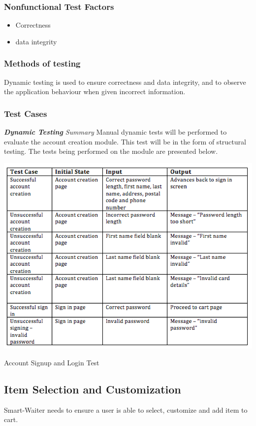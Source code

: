 \documentclass[12pt]{article}
\begin{document}
\subsubsection{Nonfunctional Test Factors}
\begin{itemize}
  \item Correctness
  \item data integrity
\end{itemize}


\subsubsection{Methods of testing}
Dynamic testing is used to ensure correctness and data integrity, and to observe the application behaviour when given incorrect information.
\subsubsection{Test Cases}
\textbf{\textit{Dynamic Testing}}\newline
\newline
\textit{Summary}\newline
Manual dynamic tests will be performed to evaluate the account creation module. This test will be in the form of structural testing. The tests being performed on the module are presented below. 
\pagebreak
\begin{table}[h]
\includegraphics[width=\textwidth,height=\textheight,keepaspectratio]{accountTC.png}
  \caption{Account Signup and Login Test}
\end{table}
\subsection{Item Selection and Customization}
Smart-Waiter needs to ensure a user is able to select, customize and add item to cart. 
\end{document}
